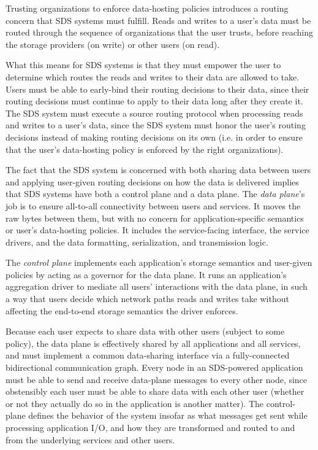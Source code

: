 Trusting organizations to enforce data-hosting policies introduces a routing
concern that SDS systems must fulfill.  Reads and writes to a user's data
must be routed through the sequence of organizations that the user trusts,
before reaching the storage providers (on write) or other users (on read).

What this means for SDS systems is that they must empower the user to determine
which routes the reads and writes to their data are allowed to take.  Users 
must be able to early-bind their routing decisions to their data, since their
routing decisions must continue to apply to their
data long after they create it.  The SDS system must execute a 
source routing protocol when processing reads and writes to a user's data, since
the SDS system must honor the user's routing decisions instead of making routing
decisions on its own (i.e. in order to ensure that the user's data-hosting
policy is enforced by the right organizations).

The fact that the SDS system is concerned with both sharing data between users
and applying user-given routing decisions on how the data is delivered implies
that SDS systems have both a control plane and a data plane.
The \emph{data plane}'s job
is to ensure all-to-all connectivity between users and services.
It moves the raw bytes between them, but with no concern for
application-specific semantics or user's data-hosting policies.
It includes the service-facing interface, the
service drivers, and the data formatting, serialization, and transmission
logic.

The \emph{control plane} implements each application's
storage semantics and user-given policies by acting as a governor for the data plane.
It runs an application's aggregation driver 
to mediate all users' interactions with the data plane, in such a way that
users decide which network paths reads and writes take without 
affecting the end-to-end storage semantics the driver enforces.

Because each user expects to share data with other users (subject to some
policy), the data plane is effectively shared by all applications and all
services, and must implement a common data-sharing interface via a fully-connected
bidirectional communication graph.
Every node in an SDS-powered application must be able to send and receive data-plane
messages to every other node, since obstensibly each user must be able to share
data with each other user (whether or not they actually do so in the application
is another matter).  The control-plane defines the behavior of the
system insofar as what messages get sent while processing application I/O, and how they are
transformed and routed to and from the underlying services and other users.

